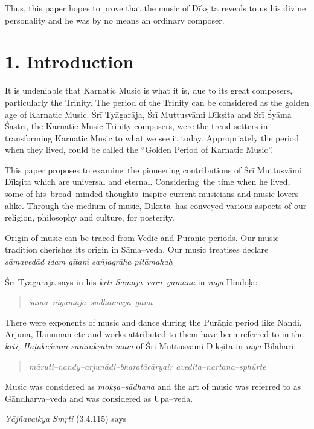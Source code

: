 Thus, this paper hopes to prove that the music of Dīkṣita reveals to us his divine personality and he was by no means an ordinary composer.


\section*{1. Introduction}

It is undeniable that Karnatic Music is what it is, due to its great composers, particularly the Trinity. The period of the Trinity can be considered as the golden age of Karnatic Music. Śrī Tyāgarāja, Śrī Muttusvāmi Dīkṣita and Śrī Śyāma Śāstrī, the Karnatic Music Trinity composers, were the trend setters in transforming Karnatic Music to what we see it today. Appropriately the period when they lived, could be called the “Golden Period of Karnatic Music”. 

This paper proposes to examine the pioneering contributions of Śrī Muttusvāmi Dīkṣita which are universal and eternal. Considering the time when he lived, some of his broad–minded thoughts inspire current musicians and music lovers alike. Through the medium of music, Dīkṣita has conveyed various aspects of our religion, philosophy and culture, for posterity. 

Origin of music can be traced from Vedic and Purāṇic periods. Our music tradition cherishes its origin in Sāma–veda. Our music treatises declare \textit{sāmavedād idam gītaṁ sañjagrāha pitāmahaḥ}

Śrī Tyāgarāja says in his \textit{kṛti Sāmaja–vara–gamana} in \textit{rāga} Hindoḷa:

\begin{verse}
\textit{sāma–nigamaja–sudhāmaya–gāna}
\end{verse}

There were exponents of music and dance during the Purāṇic period like Nandi, Arjuna, Hanuman etc and works attributed to them have been referred to in the \textit{kṛti, Hāṭakeśvara saṁrakṣatu mām} of Śri Muttusvāmi Dīkṣita in \textit{rāga} Bilahari:

\begin{verse}
\textit{māruti–nandy–arjunādi–bharatācāryair avedita–nartana–sphūrte}
\end{verse}

Music was considered as \textit{mokṣa–sādhana} and the art of music was referred to as Gāndharva–veda and was considered as Upa–veda.

\textit{Yājñavalkya Smṛti} (3.4.115) says

